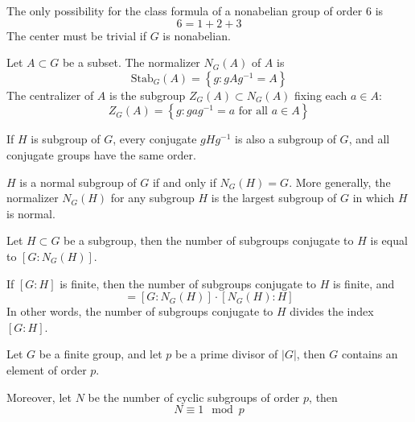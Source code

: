 \documentclass[openany]{book}
\begin{document}
\begin{prop}
    The only possibility for the class formula of a nonabelian group of order $6$ is 
    \begin{equation*}
        6=1+2+3
    \end{equation*}
    The center must be trivial if $G$ is nonabelian.
\end{prop}


\begin{defn}[normalizer]
    Let $A\subset G$ be a subset. The normalizer $N_G(A)$ of $A$ is 
    \begin{equation*}
        \text{Stab}_G(A)=\left\{g: gAg^{-1}=A\right\}
    \end{equation*}
    The centralizer of $A$ is the subgroup $Z_G(A)\subset N_G(A)$ fixing each $a\in A$:
    \begin{equation*}
        Z_G(A)=\left\{ g: gag^{-1}=a \text{ for all } a\in A\right\}
    \end{equation*}

    If $H$ is subgroup of $G$, every conjugate $gHg^{-1}$ is also a subgroup of $G$, and all conjugate groups have the same order.
\end{defn}

\begin{prop}
    $H$ is a normal subgroup of $G$ if and only if $N_G(H)=G$. More generally, the normalizer $N_G(H)$ for any subgroup $H$ is the largest subgroup of $G$ in which $H$ is normal.
\end{prop}

\begin{prop}
    Let $H\subset G$ be a subgroup, then the number of subgroups conjugate to $H$ is equal to $[G:N_G(H)]$.
\end{prop}
\begin{cor}
    If $[G:H]$ is finite, then the number of subgroups conjugate to $H$ is finite, and 
    \begin{equation*}
        [G:H]=[G:N_G(H)]\cdot[N_G(H): H]
    \end{equation*}
    In other words, the number of subgroups conjugate to $H$ divides the index $[G:H]$.
\end{cor}


\begin{thm}
    Let $G$ be a finite group, and let $p$ be a prime divisor of $|G|$, then $G$ contains an element of order $p$.

    Moreover, let $N$ be the number of cyclic subgroups of order $p$, then 
    \begin{equation*}
        N\equiv 1\mod p
    \end{equation*}
\end{thm}
\end{document}

